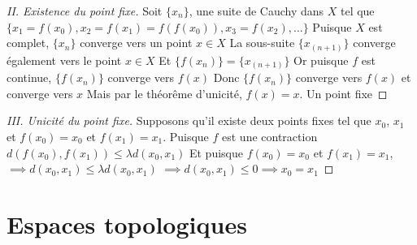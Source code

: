\documentclass[12pt]{book}
\def\sep{\phantom{}}
\theoremstyle{definition}
\begin{document}
\begin{comment}
    On construit une suite récursive, qui on le verra aura des propriétés intéressantes. \sep 
    On cherche à démontrer que c'est une suite de Cauchy. \sep
    Puisque $f$ est une fonction \hyperref[def:lambda_contractante]{$\lambda$-contractante} \sep 
    On utilise la définition de notre suite récursive. \sep 
    On "remonte" la différence de la suite jusqu'au début. \sep 
    Attention ca ne marche que pour $\lambda \geq 0$!. \sep 
    Par l'inégalité du triangle sur les suites. \sep 
    Grâce à notre inégalité $d(x_n x_{n+1}) \leq \lambda^n d(x_0, x_1)$ \sep
    On factorise nos $\lambda$ \sep 
    On équivaut nos $\lambda$ en une sommation pour retrouver la série géométrique \sep.
    En effet, une série finie positive est nécessairement plus petite qu'une série infinie positive \sep.
    On utilise le fait que la série géométrique infinie converge vers $\frac{1}{1-\lambda}$ \sep.
\end{comment}

\begin{proof}[II. Existence du point fixe]
    Soit $\{x_n\}$, une suite de Cauchy dans $X$ tel que $\{x_1 = f(x_0), x_2 = f(x_1) = f(f(x_0)), x_3 = f(x_2), \dots \}$ \sep
    Puisque $X$ est complet, $\{x_n\}$ converge vers un point $x \in X$ \sep 
    La sous-suite $\{x_{(n+1)}\}$ converge également vers le point $x \in X$ \sep
    Et $\{f(x_n)\} = \{x_{(n + 1)}\}$ \sep 
    Or puisque $f$ est continue, $\{f(x_n)\}$ converge vers $f(x)$ \sep 
    Donc $\{f(x_n)\}$ converge vers $f(x)$ et converge vers $x$ \sep
    Mais par le théorême d'unicité, $f(x) = x$. Un point fixe \sep  
\end{proof}
\begin{proof}[III. Unicité du point fixe]
    Supposons qu'il existe deux points fixes tel que $x_0$, $x_1$ et $f(x_0) = x_0$ et $f(x_1) = x_1$. \sep 
    Puisque $f$ est une contraction $d(f(x_0), f(x_1)) \leq \lambda d(x_0, x_1)$ \sep 
    Et puisque $f(x_0) = x_0$ et $f(x_1) = x_1$, $\implies d(x_0, x_1) \leq \lambda d(x_0, x_1)$ \sep 
    $\implies d(x_0, x_1) \leq 0 \implies x_0 = x_1$
\end{proof}

\chapter{Espaces topologiques}
\end{document}
